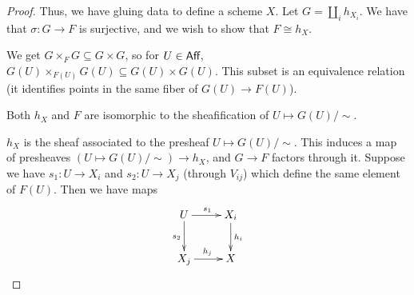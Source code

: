 \begin{proof}
  Thus, we have gluing data to define a scheme $X$. Let $G=\coprod_i h_{X_i}$. We have
  that $\sigma:G\to F$ is surjective, and we wish to show that $F\cong h_X$.

  We get $G\times_F G\subseteq G\times G$, so for $U\in \text{\sf Aff}$,  $G(U)\times_{F(U)}
  G(U)\subseteq G(U)\times G(U)$. This subset is an equivalence relation (it identifies
  points in the same fiber of $G(U)\to F(U)$).

  Both $h_X$ and $F$ are isomorphic to the sheafification of $U\mapsto G(U)/\sim$.

  $h_X$ is the sheaf associated to the presheaf $U\mapsto G(U)/\sim$. This induces a map
  of presheaves $(U\mapsto G(U)/\sim)\to h_X$, and $G\to F$ factors through it. Suppose
  we have $s_1:U\to X_i$ and $s_2:U\to X_j$ (through $V_{ij}$) which define the same
  element of $F(U)$. Then we have maps
  \[\xymatrix{
   U\ar[r]^{s_1}\ar[d]_{s_2} & X_i\ar[d]^{h_i}\\
   X_j \ar[r]^{h_j} & X
  }\]
\end{proof}
